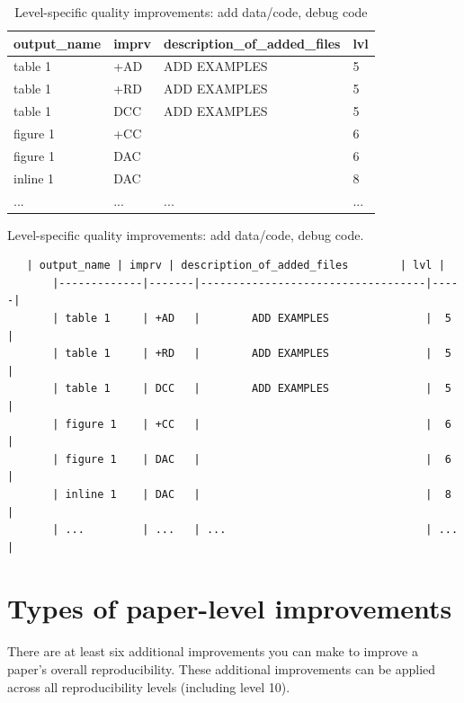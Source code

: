 \documentclass[]{book}
\begin{document}
\begin{table}

\caption{\label{tab:improvements-spreadsheet}Level-specific quality improvements: add data/code, debug code}
\centering
\begin{tabular}[t]{l|l|l|l}
\hline
output\_name & imprv & description\_of\_added\_files & lvl\\
\hline
table 1 & +AD & ADD EXAMPLES & 5\\
\hline
table 1 & +RD & ADD EXAMPLES & 5\\
\hline
table 1 & DCC & ADD EXAMPLES & 5\\
\hline
figure 1 & +CC &  & 6\\
\hline
figure 1 & DAC &  & 6\\
\hline
inline 1 & DAC &  & 8\\
\hline
... & ... & ... & ...\\
\hline
\end{tabular}
\end{table}

Level-specific quality improvements: add data/code, debug code.

\begin{verbatim}
   | output_name | imprv | description_of_added_files        | lvl |
       |-------------|-------|-----------------------------------|-----|
       | table 1     | +AD   |        ADD EXAMPLES               |  5  |
       | table 1     | +RD   |        ADD EXAMPLES               |  5  |
       | table 1     | DCC   |        ADD EXAMPLES               |  5  |
       | figure 1    | +CC   |                                   |  6  |
       | figure 1    | DAC   |                                   |  6  |
       | inline 1    | DAC   |                                   |  8  |
       | ...         | ...   | ...                               | ... |  
\end{verbatim}

\hypertarget{paper-level}{%
\section{Types of paper-level improvements}\label{paper-level}}

There are at least six additional improvements you can make to improve a paper's overall reproducibility. These additional improvements can be applied across all reproducibility levels (including level 10).
\end{document}
